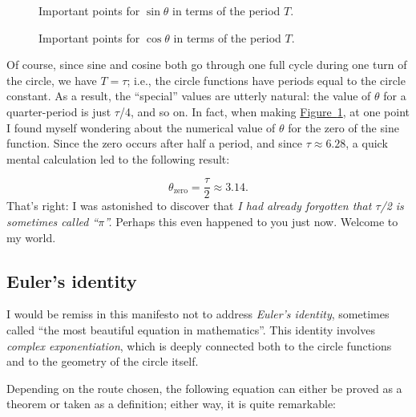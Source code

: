\documentclass{article}
\begin{document}
\begin{figure}
\begin{center}
\end{center}
\caption{Important points for $\sin\theta$ in terms of the period $T$.\label{fig:sine_with_tau}}
\end{figure}

\begin{figure}
\begin{center}
\end{center}
\caption{Important points for $\cos\theta$ in terms of the period $T$.\label{fig:cosine_with_tau}}
\end{figure}

Of course, since sine and cosine both go through one full cycle during one turn of the circle, we have $T = \tau$; i.e., the circle functions have periods equal to the circle constant. As a result, the ``special'' values are utterly natural: the value of $\theta$ for a quarter-period is just $\tau$/4, and so on. In fact, when making \hyperref[fig:sine_with_tau]{Figure~}\ref{fig:sine_with_tau}, at one point I found myself wondering about the numerical value of $\theta$ for the zero of the sine function. Since the zero occurs after half a period, and since $\tau \approx 6.28$, a quick mental calculation led to the following result:

\[
  \theta_\mathrm{zero} = \frac{\tau}{2} \approx 3.14.
\]
 That's right: I was astonished to discover that \emph{I had already forgotten that $\tau$/2 is sometimes called ``$\pi$''.} Perhaps this even happened to you just now. Welcome to my world.



   \subsection{Euler's identity} %
   \label{sec:euler_s_formula}

I would be remiss in this manifesto not to address \emph{Euler's identity}, sometimes called ``the most beautiful equation in mathematics''. This identity involves \emph{complex exponentiation}, which is deeply connected both to the circle functions and to the geometry of the circle itself.

Depending on the route chosen, the following equation can either be proved as a theorem or taken as a definition; either way, it is quite remarkable:
\end{document}
